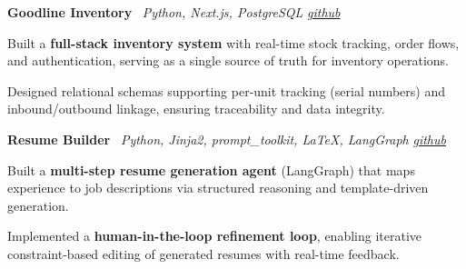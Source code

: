     \hspace{0.5em} \textbf{Goodline Inventory} \textbar \  \textit{Python, Next.js, PostgreSQL}
\hfill \textit{\href{https://github.com/knarfthekant/goodline_inventory}{github}}
    \vspace{0.10 cm}
    \begin{onecolentry}
        \begin{highlights}
            \item Built a \textbf{full-stack inventory system} with real-time stock tracking, order flows, and authentication, serving as a single source of truth for inventory operations.

            \item Designed relational schemas supporting per-unit tracking (serial numbers) and inbound/outbound linkage, ensuring traceability and data integrity.

        \end{highlights}
    \end{onecolentry}
    \vspace{0.10 cm}

    \hspace{0.5em} \textbf{Resume Builder} \textbar \  \textit{Python, Jinja2, prompt\_toolkit, LaTeX, LangGraph}
\hfill \textit{\href{https://github.com/knarfthekant/resume_builder}{github}}
    \vspace{0.10 cm}
    \begin{onecolentry}
        \begin{highlights}
            \item Built a \textbf{multi-step resume generation agent} (LangGraph) that maps experience to job descriptions via structured reasoning and template-driven generation.

            \item Implemented a \textbf{human-in-the-loop refinement loop}, enabling iterative constraint-based editing of generated resumes with real-time feedback.

        \end{highlights}
    \end{onecolentry}
    \vspace{0.10 cm}

